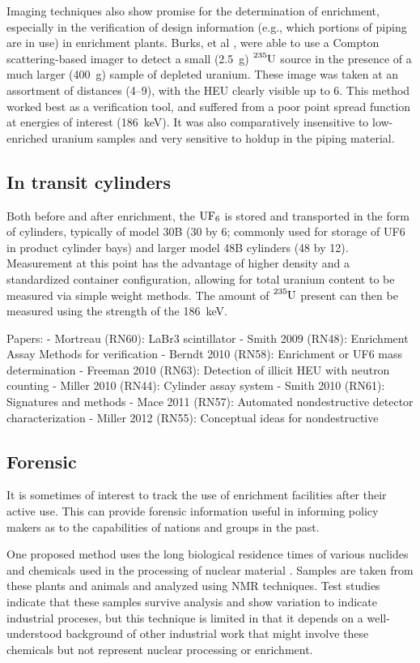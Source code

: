 \documentclass{IEEEtran}
\begin{document}
Imaging techniques also show promise for the determination of enrichment, especially in the verification of design information (e.g., which portions of piping are in use) in enrichment plants. Burks, et al \cite{RN47}, were able to use a Compton scattering-based imager to detect a small (\SI{2.5}{\gram}) $\ce{^{235}U}$ source in the presence of a much larger (\SI{400}{\gram}) sample of depleted uranium. These image was taken at an assortment of distances (\SIrange{4}{9}{\foot}), with the HEU clearly visible up to \SI{6}{\foot}. This method worked best as a verification tool, and suffered from a poor point spread function at energies of interest (\SI{186}{\kilo\electronvolt}). It was also comparatively insensitive to low-enriched uranium samples and very sensitive to holdup in the piping material.

\subsection{In transit cylinders}
Both before and after enrichment, the $\ce{UF_6}$ is stored and transported in the form of cylinders, typically of model 30B (\SI{30}{\inch} by \SI{6}{\foot}; commonly used for storage of UF6 in product cylinder bays) and larger model 48B cylinders (\SI{48}{\inch} by \SI{12}{\foot}). Measurement at this point has the advantage of higher density and a standardized container configuration, allowing for total uranium content to be measured via simple weight methods. The amount of $\ce{^{235}U}$ present can then be measured using the strength of the \SI{186}{\kilo\electronvolt}.



Papers:
- Mortreau (RN60): LaBr3 scintillator
- Smith 2009 (RN48): Enrichment Assay Methods for verification
- Berndt 2010 (RN58): Enrichment or UF6 mass determination
- Freeman 2010 (RN63): Detection of illicit HEU with neutron counting
- Miller 2010 (RN44): Cylinder assay system
- Smith 2010 (RN61): Signatures and methods
- Mace 2011 (RN57): Automated nondestructive detector characterization
- Miller 2012 (RN55): Conceptual ideas for nondestructive

\subsection{Forensic}
It is sometimes of interest to track the use of enrichment facilities after their active use. This can provide forensic information useful in informing policy makers as to the capabilities of nations and groups in the past. 

One proposed method uses the long biological residence times of various nuclides and chemicals used in the processing of nuclear material \cite{RN45}. Samples are taken from these plants and animals and analyzed using NMR techniques. Test studies indicate that these samples survive analysis and show variation to indicate industrial proceses, but this technique is limited in that it depends on a well-understood background of other industrial work that might involve these chemicals but not represent nuclear processing or enrichment.

\nocite{*}
\printbibliography
\end{document}
